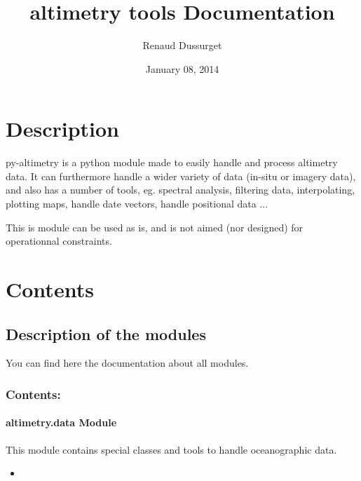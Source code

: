 \documentclass[letterpaper,10pt,english]{sphinxmanual}
\title{altimetry tools Documentation}
\date{January 08, 2014}
\author{Renaud Dussurget}
\begin{document}
\maketitle
\tableofcontents
{}\label{index::doc}



\chapter{Description}
\label{index:description}\label{index:welcome-to-altimetry-tools-s-documentation}
py-altimetry is a python module made to easily handle and process altimetry data.
It can furthermore handle a wider variety of data (in-situ or imagery data), and also has a number of tools, eg. spectral analysis, filtering data, interpolating, plotting maps, handle date vectors, handle positional data ...

This is module can be used as is, and is not aimed (nor designed) for operationnal constraints.


\chapter{Contents}
\label{index:contents}

\section{Description of the modules}
\label{Modules:description-of-the-modules}\label{Modules::doc}
You can find here the documentation about all modules.


\subsection{Contents:}
\label{Modules:contents}

\subsubsection{altimetry.data Module}
\label{altimetry.data:altimetry-data-module}\label{altimetry.data::doc}
This module contains special classes and tools to handle oceanographic data.
\begin{itemize}\setlength{\itemsep}{0pt}\setlength{\parskip}{0pt}
\item {} 

\end{itemize}
\end{document}
